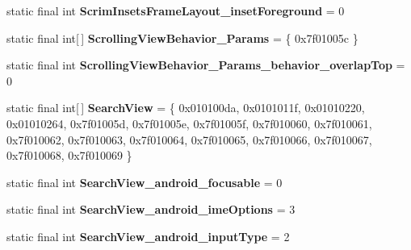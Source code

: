 \begin{DoxyCompactItemize}
\item 
\hypertarget{classandroid_1_1support_1_1design_1_1_r_1_1styleable_a843fb1a1e42f587cac983facff0ae7c0}{}static final int {\bfseries Scrim\+Insets\+Frame\+Layout\+\_\+inset\+Foreground} = 0\label{classandroid_1_1support_1_1design_1_1_r_1_1styleable_a843fb1a1e42f587cac983facff0ae7c0}

\item 
\hypertarget{classandroid_1_1support_1_1design_1_1_r_1_1styleable_a89ee309ee8c19c6a7c6343663ef077b9}{}static final int\mbox{[}$\,$\mbox{]} {\bfseries Scrolling\+View\+Behavior\+\_\+\+Params} = \{ 0x7f01005c \}\label{classandroid_1_1support_1_1design_1_1_r_1_1styleable_a89ee309ee8c19c6a7c6343663ef077b9}

\item 
\hypertarget{classandroid_1_1support_1_1design_1_1_r_1_1styleable_a7f428cc8eec79a9f1ffb54766e1be3b7}{}static final int {\bfseries Scrolling\+View\+Behavior\+\_\+\+Params\+\_\+behavior\+\_\+overlap\+Top} = 0\label{classandroid_1_1support_1_1design_1_1_r_1_1styleable_a7f428cc8eec79a9f1ffb54766e1be3b7}

\item 
\hypertarget{classandroid_1_1support_1_1design_1_1_r_1_1styleable_a8f7e72dc1bf854e14c1be7dbc1cb7392}{}static final int\mbox{[}$\,$\mbox{]} {\bfseries Search\+View} = \{ 0x010100da, 0x0101011f, 0x01010220, 0x01010264, 0x7f01005d, 0x7f01005e, 0x7f01005f, 0x7f010060, 0x7f010061, 0x7f010062, 0x7f010063, 0x7f010064, 0x7f010065, 0x7f010066, 0x7f010067, 0x7f010068, 0x7f010069 \}\label{classandroid_1_1support_1_1design_1_1_r_1_1styleable_a8f7e72dc1bf854e14c1be7dbc1cb7392}

\item 
\hypertarget{classandroid_1_1support_1_1design_1_1_r_1_1styleable_a7836ab26d5f216a4c25fe349d89f98ee}{}static final int {\bfseries Search\+View\+\_\+android\+\_\+focusable} = 0\label{classandroid_1_1support_1_1design_1_1_r_1_1styleable_a7836ab26d5f216a4c25fe349d89f98ee}

\item 
\hypertarget{classandroid_1_1support_1_1design_1_1_r_1_1styleable_a9adc851f512d660507837fbfd7465fbd}{}static final int {\bfseries Search\+View\+\_\+android\+\_\+ime\+Options} = 3\label{classandroid_1_1support_1_1design_1_1_r_1_1styleable_a9adc851f512d660507837fbfd7465fbd}

\item 
\hypertarget{classandroid_1_1support_1_1design_1_1_r_1_1styleable_ad64fde9d1d7d03e5623d79d10fbf61f3}{}static final int {\bfseries Search\+View\+\_\+android\+\_\+input\+Type} = 2\label{classandroid_1_1support_1_1design_1_1_r_1_1styleable_ad64fde9d1d7d03e5623d79d10fbf61f3}


\end{DoxyCompactItemize}

